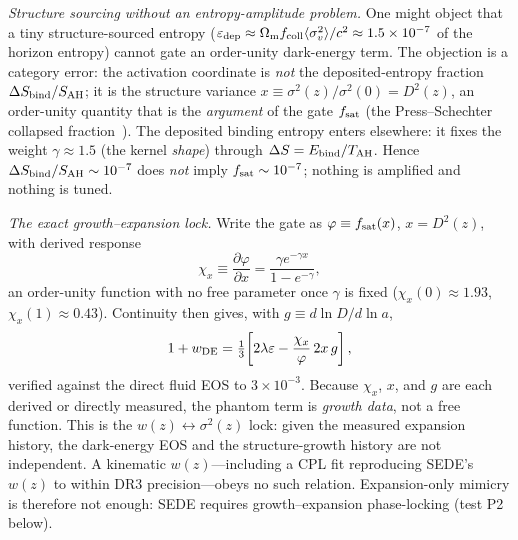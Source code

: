 \emph{Structure sourcing without an entropy-amplitude problem.} One might object that a tiny
structure-sourced entropy ($\varepsilon_{\rm dep}\approx\Omega_{\mathrm m} f_{\rm coll}\langle\sigma_v^2\rangle/c^2
\approx1.5\times10^{-7}$ of the horizon entropy) cannot gate an order-unity dark-energy term. The
objection is a category error: the activation coordinate is \emph{not} the deposited-entropy fraction
$\Delta S_{\rm bind}/S_{\rm AH}$; it is the structure variance $x\equiv\sigma^2(z)/\sigma^2(0)=D^2(z)$,
an order-unity quantity that is the \emph{argument} of the gate $f_{\mathrm{sat}}$ (the Press--Schechter collapsed
fraction~\cite{PressSchechter1974}). The deposited binding entropy enters elsewhere: it fixes the
weight $\gamma\approx1.5$ (the kernel \emph{shape}) through $\Delta S=E_{\rm bind}/T_{\mathrm{AH}}$. Hence
$\Delta S_{\rm bind}/S_{\rm AH}\sim10^{-7}$ does \emph{not} imply $f_{\mathrm{sat}}\sim10^{-7}$; nothing is
amplified and nothing is tuned.

\emph{The exact growth--expansion lock.} Write the gate as $\varphi\equiv f_{\mathrm{sat}}(x)$, $x=D^2(z)$, with
derived response
\begin{equation}
\chi_x\equiv\frac{\partial\varphi}{\partial x}=\frac{\gamma e^{-\gamma x}}{1-e^{-\gamma}},
\label{eq:chix}
\end{equation}
an order-unity function with no free parameter once $\gamma$ is fixed ($\chi_x(0)\approx1.93$,
$\chi_x(1)\approx0.43$). Continuity then gives, with $g\equiv d\ln D/d\ln a$,
\begin{equation}
1+w_{\rm DE}=\tfrac13\!\left[2\lambda\varepsilon-\frac{\chi_x}{\varphi}\,2x\,g\right],
\label{eq:lock}
\end{equation}
verified against the direct fluid EOS to $3\times10^{-3}$. Because $\chi_x$, $x$, and $g$ are each
derived or directly measured, the phantom term is \emph{growth data}, not a free function. This is the
$w(z)\leftrightarrow\sigma^2(z)$ lock: given the measured expansion history, the dark-energy EOS and the
structure-growth history are not independent. A kinematic $w(z)$---including a CPL fit reproducing
SEDE's $w(z)$ to within DR3 precision---obeys no such relation. Expansion-only mimicry is therefore not
enough: SEDE requires growth--expansion phase-locking (test P2 below).


